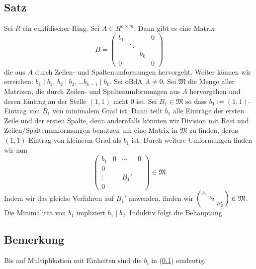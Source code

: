 \subsection[Satz: Erzeugen einer Diagonalmatrix im Fall euklidischer Ringe]{Satz} %
\label{sub:1423}
Sei $R$ ein euklidischer Ring. Sei $A \in R^{n \times m}$. Dann gibt es eine Matrix
\[
	B= \begin{pmatrix}
		b_1 & & & 0 \\
		 & \ddots & & \\
		 & & b_k & \\
		 0 & & & 0
	\end{pmatrix}
\] die aus $A$ durch Zeilen- und Spaltenumformungen hervorgeht. Weiter können wir erreichen: $b_1 \mid b_2$, $ b_2 \mid b_3$, \ldots $ b_{k-1} \mid b_k$. 
Sei oBdA $A \not= 0$. Sei $\mathfrak{M}$ die Menge aller Matrizen, die durch Zeilen- und Spaltenumformungen aus $A$ hervorgehen und deren Eintrag an der Stelle $(1,1)$
nicht $0$ ist. Sei $B_1 \in \mathfrak{M}$ so dass $b_1 := (1,1)$-Eintrag von $B_1$ von minimalem Grad ist. Dann teilt $b_1$ alle Einträge der ersten Zeile und der ersten 
Spalte, denn andernfalls könnten wir Division mit Rest und Zeilen/Spaltenumformungen benutzen um eine Matrix in $\mathfrak{M}$ zu finden, deren $(1,1)$-Eintrag von
kleinerm Grad als $b_1$ ist. Durch weitere Umformungen finden wir nun 
\[
	\begin{pmatrix}
		b_1 & 0 & \cdots & 0 \\
		0  & & & \\
		\vdots & & B_1' & \\
		0 & & & 
	\end{pmatrix} \in \mathfrak{M}
\]
Indem wir das gleiche Verfahren auf $B_1'$ anwenden, finden wir $\enbrace*{\begin{smallmatrix} b_1 & & \\ & b_2 & \\ & & B_2' \end{smallmatrix}}  \in \mathfrak{M}$.
Die Minimalität von $b_1$ impliziert $b_1 \mid b_2$. Induktiv folgt die Behauptung. \bewende

\subsection{Bemerkung} %
\label{sub:1424}
Bis auf Multiplikation mit Einheiten sind die $b_i$ in (\ref{sub:1423}) eindeutig.

